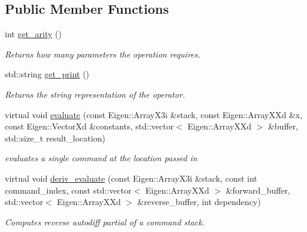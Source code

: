 \subsection*{Public Member Functions}
\begin{DoxyCompactItemize}
\item 
int \hyperlink{classSubtraction_a0ecd0c6d95631fea8c73d166a30831e8}{get\+\_\+arity} ()\hypertarget{classSubtraction_a0ecd0c6d95631fea8c73d166a30831e8}{}\label{classSubtraction_a0ecd0c6d95631fea8c73d166a30831e8}

\begin{DoxyCompactList}\small\item\em Returns how many parameters the operation requires. \end{DoxyCompactList}\item 
std\+::string \hyperlink{classSubtraction_a9de7e0f8e324423dcfb7691d41545e21}{get\+\_\+print} ()\hypertarget{classSubtraction_a9de7e0f8e324423dcfb7691d41545e21}{}\label{classSubtraction_a9de7e0f8e324423dcfb7691d41545e21}

\begin{DoxyCompactList}\small\item\em Returns the string representation of the operator. \end{DoxyCompactList}\item 
virtual void \hyperlink{classSubtraction_af0628604da8b47a69ab666a507b7b58d}{evaluate} (const Eigen\+::\+Array\+X3i \&stack, const Eigen\+::\+Array\+X\+Xd \&x, const Eigen\+::\+Vector\+Xd \&constants, std\+::vector$<$ Eigen\+::\+Array\+X\+Xd $>$ \&buffer, std\+::size\+\_\+t result\+\_\+location)
\begin{DoxyCompactList}\small\item\em evaluates a single command at the location passed in \end{DoxyCompactList}\item 
virtual void \hyperlink{classSubtraction_aabe4bc428dcc778adb63940a3e91327d}{deriv\+\_\+evaluate} (const Eigen\+::\+Array\+X3i \&stack, const int command\+\_\+index, const std\+::vector$<$ Eigen\+::\+Array\+X\+Xd $>$ \&forward\+\_\+buffer, std\+::vector$<$ Eigen\+::\+Array\+X\+Xd $>$ \&reverse\+\_\+buffer, int dependency)
\begin{DoxyCompactList}\small\item\em Computes reverse autodiff partial of a command stack. \end{DoxyCompactList}\end{DoxyCompactItemize}


